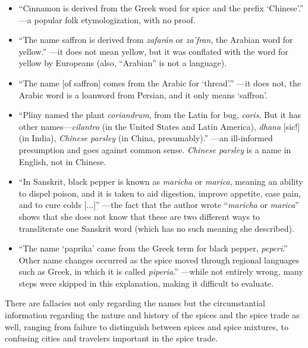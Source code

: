 \begin{itemize}
    \item ``Cinnamon is derived from the Greek word for spice and the prefix `Chinese'.'' \parencite[10]{czarra_spices_2009}---a popular folk etymologization, with no proof. 
    \item ``The name saffron is derived from \textit{zafarán} or \textit{za'fran}, the Arabian word for yellow.'' \parencite[124]{van_wyk_culinary_2014}---it does not mean yellow, but it was conflated with the word for yellow by Europeans (also, ``Arabian'' is not a language).
    \item ``The name [of saffron] comes from the Arabic for `thread'.'' \parencite[422]{mcgee_food_2004}---it does not, the Arabic word is a loanword from Persian, and it only means `saffron'. 
    \item ``Pliny named the plant \textit{coriandrum}, from the Latin for bug, \textit{coris}. But it has other names---\textit{cilantro} (in the United States and Latin America), \textit{dhana} [sic!] (in India), \textit{Chinese parsley} (in China, presumably).'' \parencite[87]{oconnell_book_2016}---an ill-informed presumption and goes against common sense. \textit{Chinese parsley} is a name in English, not in Chinese.
    \item ``In Sanskrit, black pepper is known as \textit{maricha} or \textit{marica}, meaning an ability to dispel poison, and it is taken to aid digestion, improve appetite, ease pain, and to cure colds [...]'' \parencite[3]{shaffer_pepper_2013}---the fact that the author wrote ``\textit{maricha} or \textit{marica}'' shows that she does not know that these are two different ways to transliterate one Sanskrit word (which has no such meaning she described).
    \item ``The name `paprika' came from the Greek term for black pepper, \textit{peperi}.'' 
    Other name changes occurred as the spice moved through regional languages such as Greek, in which it is called \textit{piperia}.'' 
    \parencite[103]{czarra_spices_2009}---while not entirely wrong, many steps were skipped in this explanation, making it difficult to evaluate.
\end{itemize}

There are fallacies not only regarding the names but the circumstantial information regarding the nature and history of the spices and the spice trade as well, ranging from failure to distinguish between spices and spice mixtures, to confusing cities and travelers important in the spice trade.

